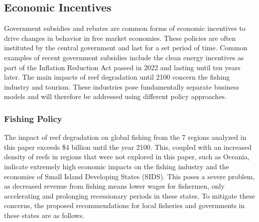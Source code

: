 \documentclass[10pt,letterpaper]{article}
\begin{document}
\subsection{Economic Incentives}
Government subsidies and rebates are common forms of economic incentives to drive changes in behavior
in free market economies. These policies are often instituted by the central government and last for a
set period of time. Common examples of recent government subsidies include the clean energy incentives
as part of the Inflation Reduction Act passed in 2022 and lasting until ten years later. The main
impacts of reef degradation until 2100 concern the fishing industry and tourism. These industries pose
fundamentally separate business models and will therefore be addressed using different policy approaches.

\subsubsection{Fishing Policy}

The impact of reef degradation on global fishing from the 7 regions analyzed in this paper exceeds
\$4 billion until the year 2100. This, coupled with an increased density of reefs in regions that were
not explored in this paper, such as Oceania, indicate extremely high economic impacts on the fishing
industry and the economies of Small Island Developing States (SIDS). This poses a severe problem, as
decreased revenue from fishing means lower wages for fishermen, only accelerating and prolonging
recessionary periods in these states. To mitigate these concerns, the proposed recommendations for
local fisheries and governments in these states are as follows.
\end{document}

